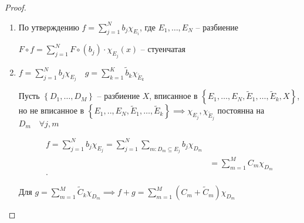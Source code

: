 \documentclass{book}
\newcommand{\tl}[1]{\widetilde{#1}}
\theoremstyle{definition}
\begin{document}
\begin{proof}
    \begin{enumerate}
        \item По утверждению $f = \sum_{j=1}^{N} b_j\chi_{E_i}$, где $E_1, \ldots, E_N$ -- разбиение

    $F\circ f = \sum_{j=1}^{N} F\circ (b_j)\cdot \chi_{E_j}(x)$ -- стуенчатая
\item $f = \sum_{j=1}^{N} b_j\chi_{E_j}\quad g = \sum_{k=1}^{K} \tl b_k \chi_{\tl E_k}$ 

    Пусть $\left\{ D_1, \ldots, D_M \right\} $ -- разбиение $X$, вписанное в  $\left\{ E_1, \ldots, E_N, \tl E_1, \ldots, \tl E_k, X \right\} $, но не вписанное в $\left\{ E_1, .., E_N, \tl E_1, \ldots, \tl E_k \right\} \implies  \chi_{E_j}, \chi_{\tl E_j}$ постоянна на $D_m\quad \forall j, m$ 

    \begin{align*}
        f = \sum_{j=1}^{N} b_j\chi_{E_j} = \sum_{j=1}^{N} \sum_{m: D_m\subseteq E_j} b_j\chi_{D_m} \\
        &= \sum_{m=1}^{M} C_m\chi_{D_m} \\
    .\end{align*}

    Для $g = \sum_{m=1}^{M} \tl C_k \chi_{D_m} \implies f + g = \sum_{m=1}^{M} \left( C_m + \tl C_m \right) \chi_{D_m}$
    \end{enumerate}
\end{proof}
\end{document}
